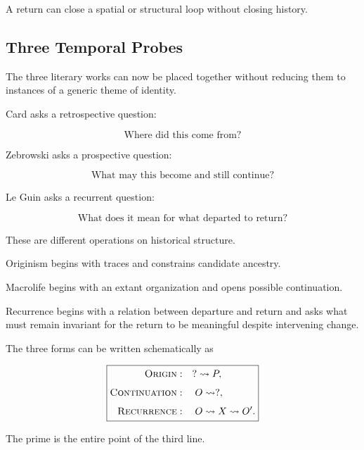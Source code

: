 \documentclass[
  11pt,
  a4paper,
  DIV=12,
  BCOR=0mm,
  parskip=half-
]{scrartcl}
\theoremstyle{definition}
\theoremstyle{plain}
\theoremstyle{remark}
\begin{document}
A return can close a spatial or structural loop without closing history.


\subsection{Three Temporal Probes}
\label{sec:three-probes}

The three literary works can now be placed together without reducing them to
instances of a generic theme of identity.

Card asks a retrospective question:

\[
  \text{Where did this come from?}
\]

Zebrowski asks a prospective question:

\[
  \text{What may this become and still continue?}
\]

Le Guin asks a recurrent question:

\[
  \text{What does it mean for what departed to return?}
\]

These are different operations on historical structure.

Originism begins with traces and constrains candidate ancestry.

Macrolife begins with an extant organization and opens possible continuation.

Recurrence begins with a relation between departure and return and asks what
must remain invariant for the return to be meaningful despite intervening
change.

The three forms can be written schematically as

\[
  \boxed{
  \begin{aligned}
    \textsc{Origin}
      &:\quad
      ?\leadsto P,
      \\[4pt]
    \textsc{Continuation}
      &:\quad
      O\leadsto ?,
      \\[4pt]
    \textsc{Recurrence}
      &:\quad
      O\leadsto X\leadsto O'.
  \end{aligned}
  }
\]

The prime is the entire point of the third line.

\end{document}
